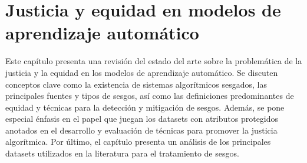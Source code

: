 \chapter{Justicia y equidad en modelos de aprendizaje autom\'atico}\label{chapter:state-of-the-art}



Este cap\'itulo presenta una revisi\'on del estado del arte sobre la problem\'atica de la justicia y la equidad en los modelos de 
aprendizaje autom\'atico. Se discuten conceptos clave como la existencia de sistemas algor\'itmicos sesgados, las principales fuentes
y tipos de sesgos, as\'i como las definiciones predominantes de equidad y t\'ecnicas para la detecci\'on y mitigaci\'on de sesgos.
Adem\'as, se pone especial \'enfasis en el papel que juegan los datasets con atributos protegidos anotados en el desarrollo
y evaluaci\'on de t\'ecnicas para promover la justicia algor\'itmica. Por \'ultimo, el cap\'itulo presenta un an\'alisis de los 
principales datasets utilizados en la literatura para el tratamiento de sesgos.

